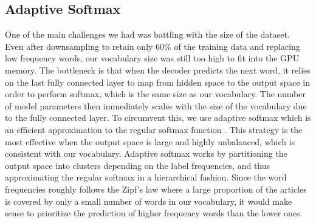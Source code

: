 \subsection{Adaptive Softmax}
One of the main challenges we had was battling with the size of the dataset. Even after downsampling to retain only $60\%$ of the training data and replacing low frequency words, our vocabulary size was still too high to fit into the GPU memory. The bottleneck is that when the decoder predicts the next word, it relies on the last fully connected layer to map from hidden space to the output space in order to perform softmax, which is the same size as our vocabulary. The number of model parameters then immediately scales with the size of the vocabulary due to the fully connected layer. To circumvent this, we use adaptive softmax which is an efficient approximation to the regular softmax function \cite{grave2016efficient}. This strategy is the most effective when the output space is large and highly unbalanced, which is consistent with our vocabulary. Adaptive softmax works by partitioning the output space into clusters depending on the label frequencies, and thus approximating the regular softmax in a hierarchical fashion. Since the word frequencies roughly follows the Zipf's law \cite{wilson1949human} where a large proportion of the articles is covered by only a small number of words in our vocabulary, it would make sense to prioritize the prediction of higher frequency words than the lower ones. 


